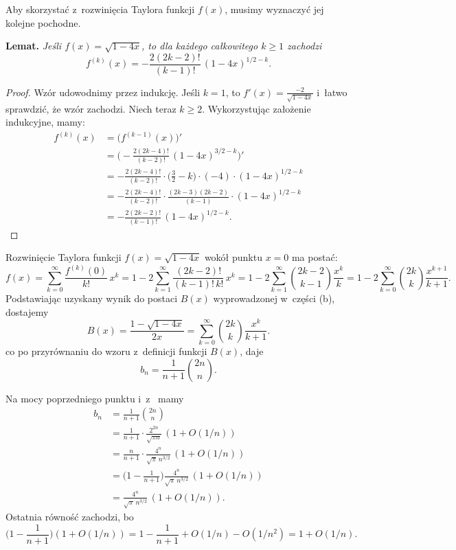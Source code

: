 \noindent Aby skorzystać z~rozwinięcia Taylora funkcji $f(x)$, musimy wyznaczyć jej kolejne pochodne.

\medskip
\noindent\textsf{\textbf{Lemat.}} \textit{Jeśli\/ $f(x)=\sqrt{1-4x}$, to dla\/ każdego całkowitego $k\ge1$ zachodzi
\[
	f^{(k)}(x) = -\frac{2(2k-2)!}{(k-1)!}\,(1-4x)^{1/2-k}.
\]
}
\begin{proof}
Wzór udowodnimy przez indukcję.
Jeśli $k=1$, to $f'(x)=\frac{-2}{\sqrt{1-4x}}$ i~łatwo sprawdzić, że wzór zachodzi.
Niech teraz $k\ge2$.
Wykorzystując założenie indukcyjne, mamy:
\begin{align*}
	f^{(k)}(x) &= \bigl(f^{(k-1)}(x)\bigr)' \\
	&= \biggl(-\frac{2(2k-4)!}{(k-2)!}\,(1-4x)^{3/2-k}\biggr)' \\[1mm]
	&= -\frac{2(2k-4)!}{(k-2)!}\cdot\biggl(\frac{3}{2}-k\biggr)\cdot(-4)\cdot(1-4x)^{1/2-k} \\[1mm]
	&= -\frac{2(2k-4)!}{(k-2)!}\cdot\frac{(2k-3)(2k-2)}{(k-1)}\cdot(1-4x)^{1/2-k} \\[1mm]
	&= -\frac{2(2k-2)!}{(k-1)!}\,(1-4x)^{1/2-k}.
\end{align*}
\end{proof}

Rozwinięcie Taylora funkcji $f(x)=\sqrt{1-4x}$ wokół punktu $x=0$ ma postać:
\[
	f(x) = \sum_{k=0}^\infty\frac{f^{(k)}(0)}{k!}\,x^k = 1-2\sum_{k=1}^\infty\frac{(2k-2)!}{(k-1)!\,k!}\,x^k = 1-2\sum_{k=1}^\infty\binom{2k-2}{k-1}\frac{x^k}{k} = 1-2\sum_{k=0}^\infty\binom{2k}{k}\frac{x^{k+1}}{k+1}.
\]
Podstawiając uzyskany wynik do postaci $B(x)$ wyprowadzonej w~części (b), dostajemy
\[
	B(x) = \frac{1-\sqrt{1-4x}}{2x} = \sum_{k=0}^\infty\binom{2k}{k}\frac{x^k}{k+1}.
\]
co po przyrównaniu do wzoru z~definicji funkcji $B(x)$, daje
\[
	b_n = \frac{1}{n+1}\binom{2n}{n}.
\]

\subproblem %
Na mocy poprzedniego punktu i~z~ mamy
\begin{align*}
	b_n &= \frac{1}{n+1}\binom{2n}{n} \\
	&= \frac{1}{n+1}\cdot\frac{2^{2n}}{\sqrt{\pi n}}\,(1+O(1/n)) \\
	&= \frac{n}{n+1}\cdot\frac{4^n}{\sqrt{\pi}\,n^{3/2}}\,(1+O(1/n)) \\
	&= \biggl(1-\frac{1}{n+1}\biggr)\frac{4^n}{\sqrt{\pi}\,n^{3/2}}\,(1+O(1/n)) \\
	&= \frac{4^n}{\sqrt{\pi}\,n^{3/2}}\,(1+O(1/n)).
\end{align*}
Ostatnia równość zachodzi, bo
\[
	\biggl(1-\frac{1}{n+1}\biggr)(1+O(1/n)) = 1-\frac{1}{n+1}+O(1/n)-O(1/n^2) = 1+O(1/n).
\]
